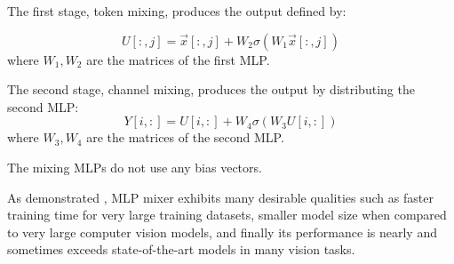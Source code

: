 The first stage, token mixing, produces the output defined by:

$$
U[:, j] = \vec x[:,j] + W_2\sigma(W_1\vec{x}[:,j])
$$
where $W_1, W_2$ are the matrices of the first MLP.

The second stage, channel mixing, produces the output by distributing the second MLP:
$$
Y[i,:] = U[i,:] + W_4\sigma(W_3 U[i,:])
$$
where $W_3, W_4$ are the matrices of the second MLP.

The mixing MLPs do not use any bias vectors.

As demonstrated \cite{tolstikhin2021mlp}, MLP mixer exhibits many desirable qualities
such as faster training time for very large training datasets, smaller model size when compared to very large computer vision models, and finally its performance is nearly and sometimes exceeds state-of-the-art models in many vision tasks.

